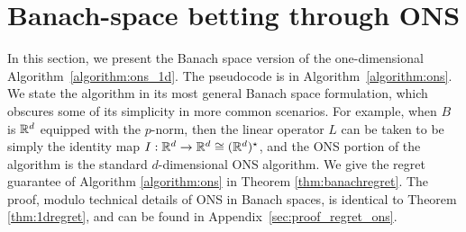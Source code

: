 \documentclass[12pt]{colt2018} %
\begin{document}
\begin{comment}
\subsection{Remarks}
\begin{itemize}
\item For the case of $\mu$-strongly-convex losses I think this gives us the optimal $O(G^2\log(T)/\mu T)$ convergence rate.

\item We can probably get logarithmic regret for other kind of ``aligned losses'' whenever $\E[\langle g_t, x_t-u\rangle]$ can be related to $\|g_t\|_\star \|x_t-u\|$ in some way (e.g. $\E[\langle g_t, x_t-u\rangle ]\ge \alpha \E[ \|g_t\|_\star \|x_t-u\|]$ for some $\alpha$).

\item Is hopefully possible to extend this reasoning to the N-dimensional newton-step version of the OLO algorithm, which might yield the full-matrix metagrad bound.

\item I'd like to say something to deal with the fact that the regret bound is super-linear in the $w_t$s. Intuitively I suspect that any ``reasonable'' base OLO algorithm should not have the $w_t$ grow too unreasonably on stochastic problems so that it won't be a big deal that the bound is superlinear in $w_t$. Is there some way to prove this?
\end{itemize}
\end{comment}



\section{Banach-space betting through ONS}\label{sec:onsbanachspace}

In this section, we present the Banach space version of the one-dimensional Algorithm~\ref{algorithm:ons_1d}. The pseudocode is in Algorithm~\ref{algorithm:ons}. We state the algorithm in its most general Banach space formulation, which obscures some of its simplicity in more common scenarios. For example, when $B$ is $\mathbb{R}^d$ equipped with the $p$-norm, then the linear operator $L$ can be taken to be simply the identity map $I:\mathbb{R}^d\to\mathbb{R}^d\cong (\mathbb{R}^d)^\star$, and the ONS portion of the algorithm is the standard $d$-dimensional ONS algorithm. We give the regret guarantee of Algorithm \ref{algorithm:ons} in Theorem \ref{thm:banachregret}. The proof, modulo technical details of ONS in Banach spaces, is identical to Theorem \ref{thm:1dregret}, and can be found in Appendix~\ref{sec:proof_regret_ons}. 
\end{document}
